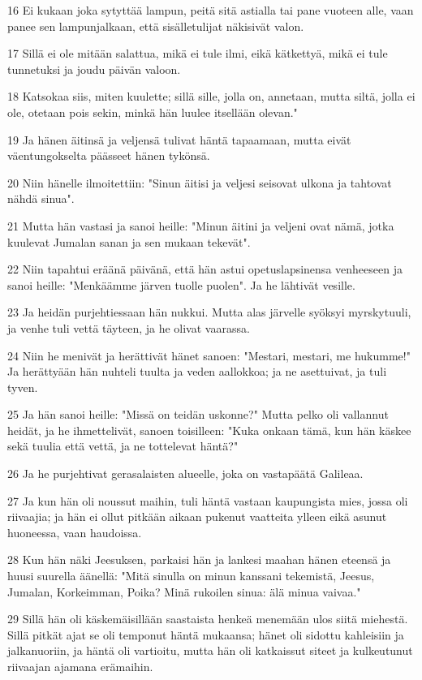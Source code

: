 \par 16 Ei kukaan joka sytyttää lampun, peitä sitä astialla tai pane vuoteen alle, vaan panee sen lampunjalkaan, että sisälletulijat näkisivät valon.
\par 17 Sillä ei ole mitään salattua, mikä ei tule ilmi, eikä kätkettyä, mikä ei tule tunnetuksi ja joudu päivän valoon.
\par 18 Katsokaa siis, miten kuulette; sillä sille, jolla on, annetaan, mutta siltä, jolla ei ole, otetaan pois sekin, minkä hän luulee itsellään olevan."
\par 19 Ja hänen äitinsä ja veljensä tulivat häntä tapaamaan, mutta eivät väentungokselta päässeet hänen tykönsä.
\par 20 Niin hänelle ilmoitettiin: "Sinun äitisi ja veljesi seisovat ulkona ja tahtovat nähdä sinua".
\par 21 Mutta hän vastasi ja sanoi heille: "Minun äitini ja veljeni ovat nämä, jotka kuulevat Jumalan sanan ja sen mukaan tekevät".
\par 22 Niin tapahtui eräänä päivänä, että hän astui opetuslapsinensa venheeseen ja sanoi heille: "Menkäämme järven tuolle puolen". Ja he lähtivät vesille.
\par 23 Ja heidän purjehtiessaan hän nukkui. Mutta alas järvelle syöksyi myrskytuuli, ja venhe tuli vettä täyteen, ja he olivat vaarassa.
\par 24 Niin he menivät ja herättivät hänet sanoen: "Mestari, mestari, me hukumme!" Ja herättyään hän nuhteli tuulta ja veden aallokkoa; ja ne asettuivat, ja tuli tyven.
\par 25 Ja hän sanoi heille: "Missä on teidän uskonne?" Mutta pelko oli vallannut heidät, ja he ihmettelivät, sanoen toisilleen: "Kuka onkaan tämä, kun hän käskee sekä tuulia että vettä, ja ne tottelevat häntä?"
\par 26 Ja he purjehtivat gerasalaisten alueelle, joka on vastapäätä Galileaa.
\par 27 Ja kun hän oli noussut maihin, tuli häntä vastaan kaupungista mies, jossa oli riivaajia; ja hän ei ollut pitkään aikaan pukenut vaatteita ylleen eikä asunut huoneessa, vaan haudoissa.
\par 28 Kun hän näki Jeesuksen, parkaisi hän ja lankesi maahan hänen eteensä ja huusi suurella äänellä: "Mitä sinulla on minun kanssani tekemistä, Jeesus, Jumalan, Korkeimman, Poika? Minä rukoilen sinua: älä minua vaivaa."
\par 29 Sillä hän oli käskemäisillään saastaista henkeä menemään ulos siitä miehestä. Sillä pitkät ajat se oli temponut häntä mukaansa; hänet oli sidottu kahleisiin ja jalkanuoriin, ja häntä oli vartioitu, mutta hän oli katkaissut siteet ja kulkeutunut riivaajan ajamana erämaihin.
